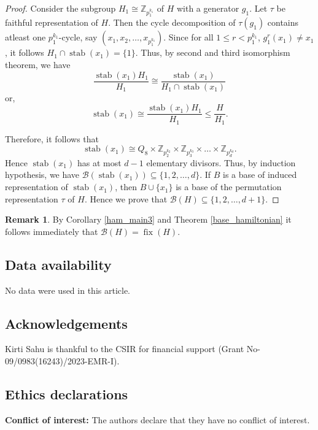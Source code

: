 \documentclass[12pt]{article}
\theoremstyle{plain}
\theoremstyle{definition}
\newtheorem{remark}[theorem]{Remark}
\newcommand{\stab}{\mathop{\mathrm{stab}}}
\newcommand{\fix}{\mathop{\mathrm{fix}}}
\begin{document}
\begin{proof}
		Consider the subgroup $H_{1} \cong \mathbb{Z}_{p_{1}^{k_{1}}}$ of $H$ with a generator $g_{1}$. Let $\tau$ be faithful representation of $H$. Then the cycle decomposition of $\tau(g_{1})$ contains atleast one $p_{1}^{k_{1}}$-cycle, say $(x_{1},x_{2},\ldots,x_{p_{1}^{k_{1}}})$. Since for all $1 \leq r < p_{1}^{k_{1}}$, $g_{1}^{r}(x_{1}) \neq x_{1}$, it follows $H_{1} \cap \stab (x_{1}) = \{1\}$. Thus, by second and third isomorphism theorem, we have 
		\[\frac{\stab(x_{1})H_{1}}{H_{1}} \cong \frac{\stab(x_{1})}{H_{1} \cap \stab(x_{1})}\]
		or, \[\stab(x_{1}) \cong \frac{\stab(x_{1})H_{1}}{H_{1}} \leq \frac{H}{H_{1}}.\] 
		
		Therefore, it follows that \[\stab(x_{1}) \cong Q_{8} \times \mathbb{Z}_{p_{2}^{k_{2}}} \times \mathbb{Z}_{p_{3}^{k_{3}}} \times \ldots \times \mathbb{Z}_{p_{d}^{k_{d}}}.\] Hence $\stab(x_{1})$ has at most $d-1$ elementary divisors. Thus, by induction hypothesis, we have $\mathcal{B}(\stab(x_{1})) \subseteq \{1,2,\ldots,d\}$. If $B$ is a base of induced representation of $\stab(x_{1})$, then $B \cup \{x_{1}\}$ is a base of the permutation representation $\tau$ of $H$. Hence we prove that $\mathcal{B}(H) \subseteq \{1,2,\ldots,d+1\}$.    
		\end{proof}
	
	\begin{remark}By Corollary \ref{ham_main3} and Theorem \ref{base_hamiltonian} it follows immediately that $\mathcal{B}(H) = \fix(H)$.
	\end{remark}
	
	\subsection*{Data availability}
	No data were used in this article.
	\subsection*{Acknowledgements}
	Kirti Sahu is thankful to the CSIR for financial support (Grant No- 09/0983(16243)/2023-EMR-I).	
	
	\subsection*{Ethics declarations}
	\textbf{Conflict of interest:} The authors declare that they have no conflict of interest.
	
\end{document}
